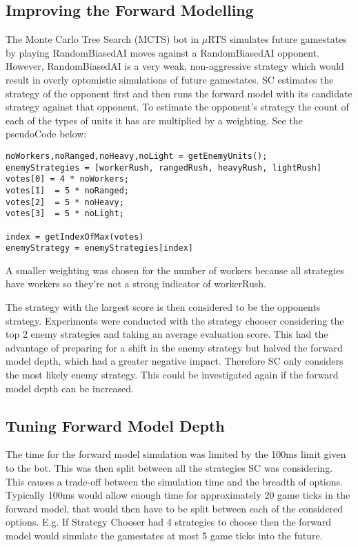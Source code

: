 \documentclass[]{article}
\begin{document}
\subsection{Improving the Forward Modelling}
The Monte Carlo Tree Search (MCTS) bot in $\mu$RTS simulates future gamestates by playing RandomBiasedAI moves against a RandomBiasedAI opponent. However, RandomBiasedAI is a very weak, non-aggressive strategy which would result in overly optomistic simulations of future gamestates.  SC estimates the strategy of the opponent first and then runs the forward model with its candidate strategy against that opponent. To estimate the opponent's strategy the count of each of the types of units it has are multiplied by a weighting. See the pseudoCode below:
\begin{lstlisting}
noWorkers,noRanged,noHeavy,noLight = getEnemyUnits();
enemyStrategies = [workerRush, rangedRush, heavyRush, lightRush]
votes[0] = 4 * noWorkers;
votes[1]  = 5 * noRanged;
votes[2]  = 5 * noHeavy;
votes[3]  = 5 * noLight;

index = getIndexOfMax(votes)
enemyStrategy = enemyStrategies[index]
\end{lstlisting}
A smaller weighting was chosen for the number of workers because all strategies have workers so they're not a strong indicator of workerRush. 

The strategy with the largest score is then considered to be the opponents strategy. Experiments were conducted with the strategy chooser considering the top 2 enemy strategies and taking an average evaluation score. This had the advantage of preparing for a shift in the enemy strategy but halved the forward model depth, which had a greater negative impact. Therefore SC only considers the most likely enemy strategy. This could be investigated again if the forward model depth can be increased.

\subsection{Tuning Forward Model Depth}
The time for the forward model simulation was limited by the 100ms limit given to the bot. This was then split between all the strategies SC was considering. This causes a trade-off between the simulation time and the breadth of options. Typically 100ms would allow enough time for approximately 20 game ticks in the forward model, that would then have to be split between each of the considered options. E.g. If Strategy Chooser had 4 strategies to choose then the forward model would simulate the gamestates at most 5 game ticks into the future.  
\end{document}
